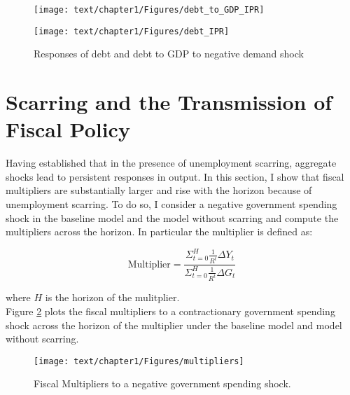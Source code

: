 \begin{figure}[!h]
    \centering
   \begin{minipage}{0.47\textwidth}
        \centering
        \texttt{[image: text/chapter1/Figures/debt\_to\_GDP\_IPR]} %
    \end{minipage}\hfill
    \begin{minipage}{0.47\textwidth}
        \centering
        \texttt{[image: text/chapter1/Figures/debt\_IPR]} %
    \end{minipage}
    \caption{Responses of debt and debt to GDP to negative demand shock}
    \label{debt_to_GDP}
\end{figure}


\section{Scarring and the Transmission of Fiscal Policy}

Having established that in the presence of unemployment scarring, aggregate shocks lead to persistent responses in output. In this section, I show that fiscal multipliers are substantially larger and rise with the horizon because of unemployment scarring. To do so, I consider a negative government spending shock in the baseline model and the model without scarring and compute the multipliers across the horizon. In particular the multiplier is defined as:



$$ \text{Multiplier} = \frac{\Sigma_{t=0}^{H}  \frac{1}{R^{t}}\Delta Y_{t}}{ \Sigma_{t=0}^{H}  \frac{1}{R^{t}}\Delta{G_{t}}}$$ 

where $H$ is the horizon of the mulitplier. \\

Figure \ref{Fiscal_multipliers} plots the fiscal multipliers to a contractionary government spending shock across the horizon of the multiplier under the baseline model and model without scarring.


\begin{figure}[!h]
    \centering
   \begin{minipage}{0.68\textwidth}
        \centering
        \texttt{[image: text/chapter1/Figures/multipliers]} %
    \end{minipage}
        \caption{Fiscal Multipliers to a negative government spending shock.}
    \label{Fiscal_multipliers}
\end{figure}


